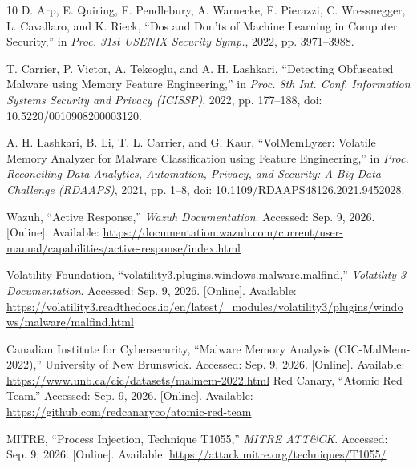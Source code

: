 \documentclass[conference]{IEEEtran}
\begin{document}
\begin{thebibliography}{10}
 D. Arp, E. Quiring, F. Pendlebury, A. Warnecke,
F. Pierazzi, C. Wressnegger, L. Cavallaro, and K. Rieck,
``Dos and Don'ts of Machine Learning in Computer Security,'' in
\textit{Proc. 31st USENIX Security Symp.}, 2022, pp. 3971--3988.

 T. Carrier, P. Victor, A. Tekeoglu, and A. H. Lashkari,
``Detecting Obfuscated Malware using Memory Feature Engineering,'' in
\textit{Proc. 8th Int. Conf. Information Systems Security and Privacy
(ICISSP)}, 2022, pp. 177--188, doi: 10.5220/0010908200003120.

 A. H. Lashkari, B. Li, T. L. Carrier, and G. Kaur,
``VolMemLyzer: Volatile Memory Analyzer for Malware Classification using
Feature Engineering,'' in \textit{Proc. Reconciling Data Analytics,
Automation, Privacy, and Security: A Big Data Challenge (RDAAPS)},
2021, pp. 1--8, doi: 10.1109/RDAAPS48126.2021.9452028.

 Wazuh, ``Active Response,'' \textit{Wazuh Documentation}.
Accessed: Sep. 9, 2026. [Online]. Available:
\url{https://documentation.wazuh.com/current/user-manual/capabilities/active-response/index.html}

 Volatility Foundation,
``volatility3.plugins.windows.malware.malfind,''
\textit{Volatility 3 Documentation}.
Accessed: Sep. 9, 2026. [Online]. Available:
\url{https://volatility3.readthedocs.io/en/latest/_modules/volatility3/plugins/windows/malware/malfind.html}

 Canadian Institute for Cybersecurity,
``Malware Memory Analysis (CIC-MalMem-2022),'' University of New Brunswick.
Accessed: Sep. 9, 2026. [Online]. Available:
\url{https://www.unb.ca/cic/datasets/malmem-2022.html}
 Red Canary, ``Atomic Red Team.''
Accessed: Sep. 9, 2026. [Online]. Available:
\url{https://github.com/redcanaryco/atomic-red-team}

 MITRE, ``Process Injection, Technique T1055,''
\textit{MITRE ATT\&CK}.
Accessed: Sep. 9, 2026. [Online]. Available:
\url{https://attack.mitre.org/techniques/T1055/}

\end{thebibliography}
\end{document}
